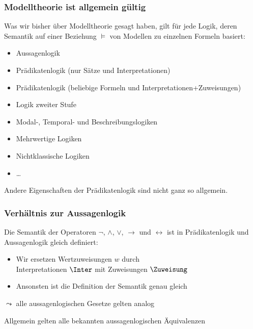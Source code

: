 \documentclass[aspectratio=1610,onlymath]{beamer}
\begin{document}
\begin{frame}\frametitle{Modelltheorie ist allgemein gültig}

Was wir bisher über Modelltheorie gesagt haben, gilt für jede
Logik, deren Semantik auf einer Beziehung $\models$ von Modellen
zu einzelnen Formeln basiert:
\begin{itemize}
\item Aussagenlogik
\item Prädikatenlogik (nur Sätze und Interpretationen)
\item Prädikatenlogik (beliebige Formeln und Interpretationen+Zuweisungen)
\item Logik zweiter Stufe
\item Modal-, Temporal- und Beschreibungslogiken
\item Mehrwertige Logiken
\item Nichtklassische Logiken
\item \ldots
\end{itemize}

Andere Eigenschaften der Prädikatenlogik sind nicht ganz so allgemein.

\end{frame}



\begin{frame}\frametitle{Verhältnis zur Aussagenlogik}

Die Semantik der Operatoren $\neg$, $\wedge$, $\vee$, $\to$ und $\leftrightarrow$ ist
in Prädikatenlogik und Aussagenlogik gleich definiert:
\begin{itemize}
\item Wir ersetzen Wertzuweisungen $w$ durch\\
	Interpretationen $\Inter$ mit Zuweisungen $\Zuweisung$
\item Ansonsten ist die Definition der Semantik genau gleich
\end{itemize}
$\leadsto$ alle aussagenlogischen Gesetze gelten analog
\bigskip\pause


Allgemein gelten alle bekannten aussagenlogischen Äquivalenzen

\end{frame}
\end{document}
